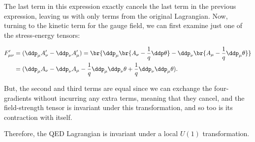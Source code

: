 The last term in this expression exactly cancels the last term in the previous expression, leaving us with only terms from the original Lagrangian. Now, turning to the kinetic term for the gauge field, we can first examine just one of the stress-energy tensors:

\begin{align*}
    F_{\mu\nu}' 
    &= (\ddp_{\mu}A_{\nu}' - \ddp_{\nu}A_{\mu}') = \br{\ddp_{\mu}\br{A_{\nu} - \frac{1}{q}\ddp\theta} - \ddp_{\nu}\br{A_{\mu} - \frac{1}{q}\ddp_{\mu}\theta}} \\
    &= (\ddp_{\mu}A_{\nu} - \ddp_{\nu}A_{\mu} - \frac{1}{q}\ddp_{\mu}\ddp_{\nu}\theta + \frac{1}{q}\ddp_{\nu}\ddp_{\mu}\theta).
\end{align*}

But, the second and third terms are equal since we can exchange the four-gradients without incurring any extra terms, meaning that they cancel, and the field-strength tensor is invariant under this transformation, and so too is its contraction with itself.

Therefore, the QED Lagrangian is invariant under a local $U(1)$ transformation.